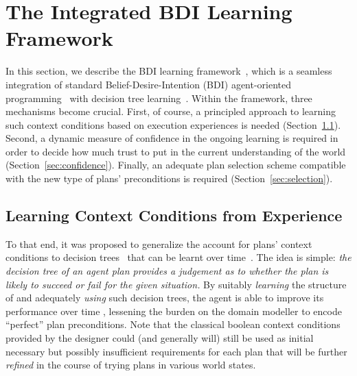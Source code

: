 \section{The Integrated BDI Learning Framework}\label{sec:framework}


In this section, we describe the BDI learning framework~\cite{airiau09:enhancing,singh10:extending,singh10:learning}, which is a seamless integration of standard Belief-Desire-Intention (BDI) agent-oriented programming~\cite{Rao96:AgentSpeak,WooldridgeBook} with decision tree learning~\cite{Mitchell97:ML}. 
%
Within the framework, three mechanisms become crucial. First, of course, a principled approach to learning such context conditions based on execution experiences is needed (Section~\ref{sec:context}). Second, a dynamic measure of confidence in the ongoing learning is required in order to decide how much trust to put in the current understanding of the world (Section~\ref{sec:confidence}). Finally, an adequate plan selection scheme compatible with the new type of plans' preconditions is required (Section~\ref{sec:selection}).

\subsection{Learning Context Conditions from Experience}\label{sec:context}
To that end, it was proposed to generalize the account for plans' context conditions to decision trees~\cite{Mitchell97:ML} that can be learnt over time~\cite{airiau09:enhancing,singh10:extending,singh10:learning}. The idea is simple: \emph{the decision tree of an agent plan provides a judgement as to whether the plan is likely to succeed or fail for the given situation.}
By suitably \emph{learning} the structure of and adequately \emph{using} such decision trees, the agent is able to improve its performance over time 
, lessening the burden on
the domain modeller to encode ``perfect'' plan preconditions. Note that the classical boolean context conditions provided by the designer could (and generally will) still be used as initial necessary but possibly insufficient requirements for each plan that will be further \emph{refined} in the course of trying plans in various world states.

